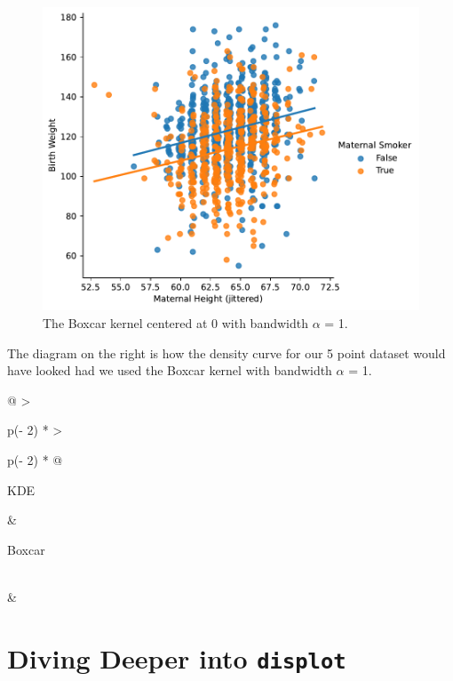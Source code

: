 \documentclass[
  letterpaper,
  DIV=11,
  numbers=noendperiod]{scrreprt}
\begin{document}
\begin{figure}[H]

{\centering \includegraphics{visualization_2/visualization_2_files/figure-pdf/cell-10-output-1.pdf}

}

\caption{The Boxcar kernel centered at 0 with bandwidth \(\alpha\) = 1.}

\end{figure}%

The diagram on the right is how the density curve for our 5 point
dataset would have looked had we used the Boxcar kernel with bandwidth
\(\alpha\) = 1.

\begin{longtable}[]{@{}
  >{\raggedright\arraybackslash}p{(\columnwidth - 2\tabcolsep) * }
  >{\raggedright\arraybackslash}p{(\columnwidth - 2\tabcolsep) * }@{}}
\toprule\noalign{}
\begin{minipage}[b]{\linewidth}\raggedright
KDE
\end{minipage} & \begin{minipage}[b]{\linewidth}\raggedright
Boxcar
\end{minipage} \\
\midrule\noalign{}
\endhead
\bottomrule\noalign{}
\endlastfoot
& \\
\end{longtable}

\section{\texorpdfstring{Diving Deeper into
\texttt{displot}}{Diving Deeper into displot}}\label{diving-deeper-into-displot}
\end{document}
